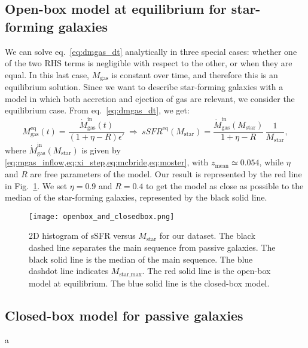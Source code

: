 \documentclass[fleqn,usenatbib]{mnras}
\begin{document}
\subsection{Open-box model at equilibrium for star-forming galaxies}\label{sec:open_box}
We can solve eq.~\ref{eq:dmgas_dt} analytically in three special cases: whether one of the two RHS terms is negligible with respect to the other, or when they are equal. In this last case, $M_\text{gas}$ is constant over time, and therefore this is an equilibrium solution. Since we want to describe star-forming galaxies with a model in which both accretion and ejection of gas are relevant, we consider the equilibrium case. From eq.~\ref{eq:dmgas_dt}, we get:
{\fontsize{7.9pt}{7.9pt}\begin{equation}
    M^\text{eq}_\text{gas}(t) = \dfrac{\dot{M}_\text{gas}^\text{in}(t)}{(1+\eta-R)\epsilon'} \: \Rightarrow \: sSFR^\text{eq}\left(M_{\text{star}}\right) = \dfrac{\dot{M}_\text{gas}^\text{in}\left(M_{\text{star}}\right)}{1+\eta-R} \, \dfrac{1}{M_\text{star}},
	\label{eq:openbox_equilibrium}
\end{equation}}
where $\dot{M}_\text{gas}^\text{in}\left(M_{\text{star}}\right)$ is given by \cref{eq:mgas_inflow,eq:xi_step,eq:mcbride,eq:moster}, with $z_{\text{mean}} \simeq 0.054$, while $\eta$ and $R$ are free parameters of the model. Our result is represented by the red line in Fig.~\ref{fig:openbox_and_closedbox}. We set $\eta=0.9$ and $R=0.4$ to get the model as close as possible to the median of the star-forming galaxies, represented by the black solid line.

\begin{figure}\centering
	\texttt{[image: openbox\_and\_closedbox.png]}
    \caption{2D histogram of sSFR versus $M_{\text{star}}$ for our dataset. The black dashed line separates the main sequence from passive galaxies. The black solid line is the median of the main sequence. The blue dashdot line indicates $M_{\text{star,max}}$. The red solid line is the open-box model at equilibrium. The blue solid line is the closed-box model.}
    \label{fig:openbox_and_closedbox}
\end{figure}

\subsection{Closed-box model for passive galaxies}\label{sec:closed_box}
a
\end{document}

